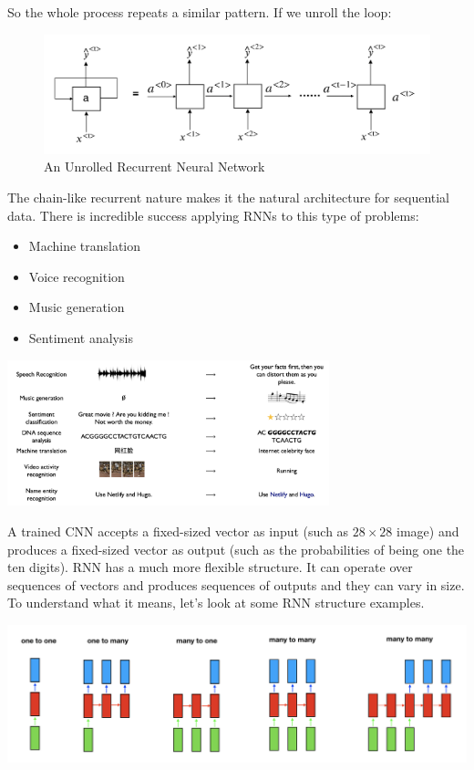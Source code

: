 \documentclass[12pt,]{krantz}
\providecommand{\tightlist}{%
  \setlength{\itemsep}{0pt}\setlength{\parskip}{0pt}}
\begin{document}
So the whole process repeats a similar pattern. If we unroll the loop:

\begin{figure}

{\centering \includegraphics[width=0.9\linewidth]{images/rnnrollout} 

}

\caption{An Unrolled Recurrent Neural Network}\label{fig:unrolledrnn}
\end{figure}

The chain-like recurrent nature makes it the natural architecture for sequential data. There is incredible success applying RNNs to this type of problems:

\begin{itemize}
\tightlist
\item
  Machine translation
\item
  Voice recognition
\item
  Music generation
\item
  Sentiment analysis
\end{itemize}

\includegraphics[width=0.7\textwidth,height=\textheight]{images/rnnapplication.png}

A trained CNN accepts a fixed-sized vector as input (such as \(28 \times 28\) image) and produces a fixed-sized vector as output (such as the probabilities of being one the ten digits). RNN has a much more flexible structure. It can operate over sequences of vectors and produces sequences of outputs and they can vary in size. To understand what it means, let's look at some RNN structure examples.

\includegraphics[width=1\textwidth,height=\textheight]{images/rnnstrs.png}
\end{document}

